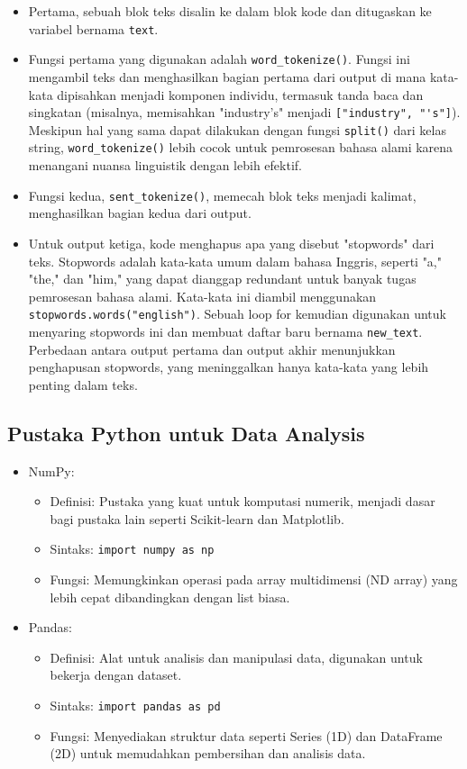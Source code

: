 \documentclass{article}
\begin{document}
\begin{itemize}
    \item Pertama, sebuah blok teks disalin ke dalam blok kode dan ditugaskan ke variabel bernama \verb|text|.
    \item Fungsi pertama yang digunakan adalah \verb|word_tokenize()|. Fungsi ini mengambil teks dan menghasilkan bagian pertama dari output di mana kata-kata dipisahkan menjadi komponen individu, termasuk tanda baca dan singkatan (misalnya, memisahkan "industry's" menjadi \verb|["industry", "'s"]|). Meskipun hal yang sama dapat dilakukan dengan fungsi \verb|split()| dari kelas string, \verb|word_tokenize()| lebih cocok untuk pemrosesan bahasa alami karena menangani nuansa linguistik dengan lebih efektif.
    \item Fungsi kedua, \verb|sent_tokenize()|, memecah blok teks menjadi kalimat, menghasilkan bagian kedua dari output.
    \item Untuk output ketiga, kode menghapus apa yang disebut "stopwords" dari teks. Stopwords adalah kata-kata umum dalam bahasa Inggris, seperti "a," "the," dan "him," yang dapat dianggap redundant untuk banyak tugas pemrosesan bahasa alami. Kata-kata ini diambil menggunakan \verb|stopwords.words("english")|. Sebuah loop for kemudian digunakan untuk menyaring stopwords ini dan membuat daftar baru bernama \verb|new_text|. Perbedaan antara output pertama dan output akhir menunjukkan penghapusan stopwords, yang meninggalkan hanya kata-kata yang lebih penting dalam teks.
\end{itemize}

\subsection{Pustaka Python untuk Data Analysis}
\begin{itemize}
    \item NumPy:
          \begin{itemize}
              \item Definisi: Pustaka yang kuat untuk komputasi numerik, menjadi dasar bagi pustaka lain seperti Scikit-learn dan Matplotlib.
              \item Sintaks: \verb|import numpy as np|
              \item Fungsi: Memungkinkan operasi pada array multidimensi (ND array) yang lebih cepat dibandingkan dengan list biasa.
          \end{itemize}
    \item Pandas:
          \begin{itemize}
              \item Definisi: Alat untuk analisis dan manipulasi data, digunakan untuk bekerja dengan dataset.
              \item Sintaks: \verb|import pandas as pd|
              \item Fungsi: Menyediakan struktur data seperti Series (1D) dan DataFrame (2D) untuk memudahkan pembersihan dan analisis data.
          \end{itemize}
\end{itemize}
\end{document}
